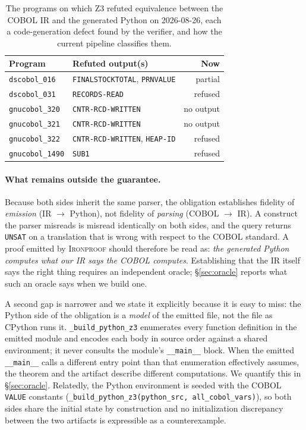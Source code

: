 \documentclass[sigconf,nonacm]{acmart}
\begin{document}
\begin{table}[t]
\centering
\caption{The programs on which Z3 refuted equivalence between the COBOL IR and the generated Python on 2026-08-26, each a code-generation defect found by the verifier, and how the current pipeline classifies them.}
\label{tab:refuted}
\small
\begin{tabular}{@{}llr@{}}
\toprule
\textbf{Program} & \textbf{Refuted output(s)} & \textbf{Now} \\
\midrule
\texttt{dscobol\_016}  & \texttt{FINALSTOCKTOTAL}, \texttt{PRNVALUE} & partial \\
\texttt{dscobol\_031} & \texttt{RECORDS-READ} & refused \\
\texttt{gnucobol\_320}          & \texttt{CNTR-RCD-WRITTEN} & no output \\
\texttt{gnucobol\_321}          & \texttt{CNTR-RCD-WRITTEN} & no output \\
\texttt{gnucobol\_322}          & \texttt{CNTR-RCD-WRITTEN}, \texttt{HEAP-ID} & refused \\
\texttt{gnucobol\_1490}         & \texttt{SUB1} & refused \\
\bottomrule
\end{tabular}
\end{table}

\paragraph{What remains outside the guarantee.} Because both sides inherit the same parser, the obligation establishes fidelity of \emph{emission} (IR $\to$ Python), not fidelity of \emph{parsing} (COBOL $\to$ IR). A construct the parser misreads is misread identically on both sides, and the query returns \texttt{UNSAT} on a translation that is wrong with respect to the COBOL standard. A proof emitted by \textsc{Ironproof} should therefore be read as: \emph{the generated Python computes what our IR says the COBOL computes}. Establishing that the IR itself says the right thing requires an independent oracle; \S\ref{sec:oracle} reports what such an oracle says when we build one.

A second gap is narrower and we state it explicitly because it is easy to miss: the Python side of the obligation is a \emph{model} of the emitted file, not the file as CPython runs it. \texttt{\_build\_python\_z3} enumerates every function definition in the emitted module and encodes each body in source order against a shared environment; it never consults the module's \texttt{\_\_main\_\_} block. When the emitted \texttt{\_\_main\_\_} calls a different entry point than that enumeration effectively assumes, the theorem and the artifact describe different computations. We quantify this in \S\ref{sec:oracle}. Relatedly, the Python environment is seeded with the COBOL \texttt{VALUE} constants (\texttt{\_build\_python\_z3(python\_src, all\_cobol\_vars)}), so both sides share the initial state by construction and no initialization discrepancy between the two artifacts is expressible as a counterexample.
\end{document}
